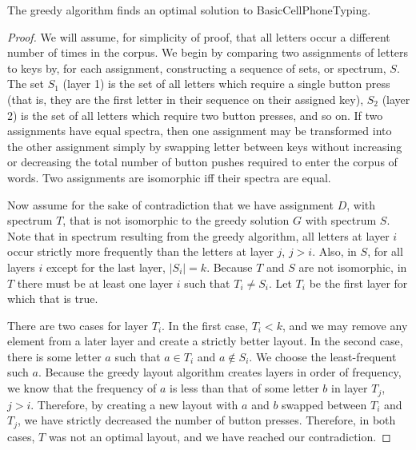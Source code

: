\documentclass[runningheads]{llncs}
\begin{document}
\begin{theorem}
The greedy algorithm finds an optimal solution to {\sc BasicCellPhoneTyping}.
\label{basicthm}
\end{theorem}
\begin{proof}
We will assume, for simplicity of proof, that all letters occur a different number of times in the corpus.  
We begin by comparing two assignments of letters to keys by, for each assignment,
constructing a sequence of sets, or spectrum, $S$.  The set $S_1$ (layer 1) is the set of all
letters which require a single button press (that is, they are the first
letter in their sequence on their assigned key), $S_2$ (layer 2) is the set of
all letters which require two button presses, and so on.  If two assignments
have equal spectra, then one assignment may be transformed into
the other assignment simply by swapping letter between keys without
increasing or decreasing the total number of button pushes required to enter
the corpus of words.   Two assignments are isomorphic iff their spectra are equal.

Now assume for the sake of contradiction that we have assignment $D$, with spectrum $T$, that is not isomorphic to the greedy solution $G$ with spectrum $S$.
Note that in spectrum resulting from the greedy algorithm, all letters at layer
$i$ occur strictly more frequently than the letters at layer $j$, $j > i$.
Also, in $S$, for all layers $i$ except for the last layer, $|S_i| = k$.
Because $T$ and $S$ are not isomorphic, in $T$ there must be at least one layer $i$ such that $T_i \neq S_i$.  Let $T_i$ be the first layer for which that is true.

There are two cases for layer $T_i$.  In the first case, $T_i < k$, and we may
remove any element from a later layer and create a strictly better layout.  In
the second case, there is some letter $a$ such that $a \in T_i$ and $a \not\in
S_i$.  We choose the least-frequent such $a$.  Because the greedy layout
algorithm creates layers in order of frequency, we know that the frequency of
$a$ is less than that of some letter $b$ in layer $T_j$, $j>i$.  Therefore, by
creating a new layout with $a$ and $b$ swapped between $T_i$ and $T_j$, we have
strictly decreased the number of button presses.  Therefore, in both cases,
$T$ was not an optimal layout, and we have reached our contradiction.
\end{proof}
\end{document}
